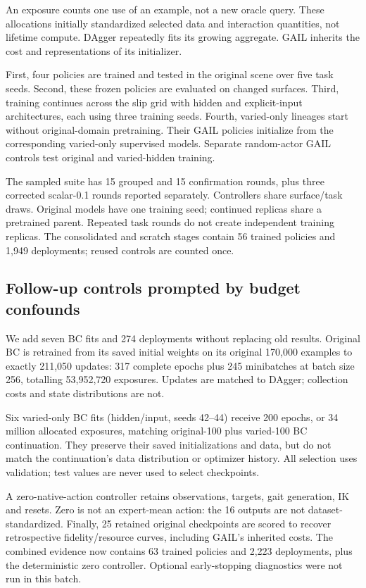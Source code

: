 \documentclass[10pt,a4paper,twocolumn]{article}
\begin{document}
An exposure counts one use of an example, not a new oracle query. These allocations initially standardized selected data and interaction quantities, not lifetime compute. DAgger repeatedly fits its growing aggregate. GAIL inherits the cost and representations of its initializer.

First, four policies are trained and tested in the original scene over five task seeds. Second, these frozen policies are evaluated on changed surfaces. Third, training continues across the slip grid with hidden and explicit-input architectures, each using three training seeds. Fourth, varied-only lineages start without original-domain pretraining. Their GAIL policies initialize from the corresponding varied-only supervised models. Separate random-actor GAIL controls test original and varied-hidden training.

The sampled suite has 15 grouped and 15 confirmation rounds, plus three corrected scalar-0.1 rounds reported separately. Controllers share surface/task draws. Original models have one training seed; continued replicas share a pretrained parent. Repeated task rounds do not create independent training replicas. The consolidated and scratch stages contain 56 trained policies and 1,949 deployments; reused controls are counted once.

\subsection{Follow-up controls prompted by budget confounds}

We add seven BC fits and 274 deployments without replacing old results. Original BC is retrained from its saved initial weights on its original 170,000 examples to exactly 211,050 updates: 317 complete epochs plus 245 minibatches at batch size 256, totalling 53,952,720 exposures. Updates are matched to DAgger; collection costs and state distributions are not.

Six varied-only BC fits (hidden/input, seeds 42--44) receive 200 epochs, or 34 million allocated exposures, matching original-100 plus varied-100 BC continuation. They preserve their saved initializations and data, but do not match the continuation's data distribution or optimizer history. All selection uses validation; test values are never used to select checkpoints.

A zero-native-action controller retains observations, targets, gait generation, IK and resets. Zero is not an expert-mean action: the 16 outputs are not dataset-standardized. Finally, 25 retained original checkpoints are scored to recover retrospective fidelity/resource curves, including GAIL's inherited costs. The combined evidence now contains 63 trained policies and 2,223 deployments, plus the deterministic zero controller. Optional early-stopping diagnostics were not run in this batch.
\end{document}
